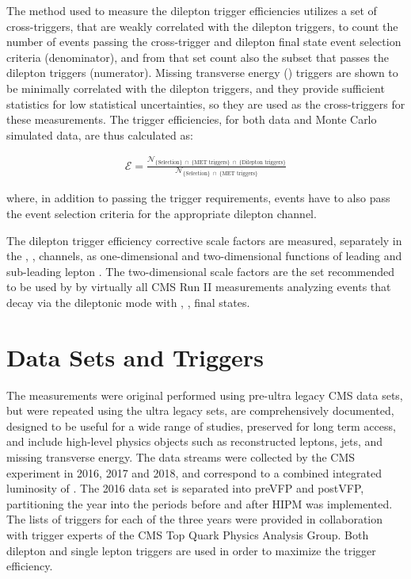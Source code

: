 The method used to measure the dilepton trigger efficiencies utilizes a set of cross-triggers, that are weakly correlated with the dilepton triggers, to count the number of events passing the cross-trigger and \ttbar dilepton final state event selection criteria (denominator), and from that set count also the subset that passes the dilepton triggers (numerator).
Missing transverse energy (\MET) triggers are shown to be minimally correlated with the dilepton triggers, and they provide sufficient statistics for low statistical uncertainties, so they are used as the cross-triggers for these measurements. 
The trigger efficiencies, for both data and Monte Carlo simulated data, are thus calculated as: 
\begin{linenomath*}
\begin{align}
\mathcal{E} = \frac{\mathcal{N}_{\{\text{Selection}\} \; \cap \; \{\text{MET triggers}\} \; \cap \; \{\text{Dilepton triggers\}}}}{\mathcal{N}_{\{\text{Selection}\} \; \cap \; \{\text{MET triggers\}}}}
\label{efficiency}
\end{align}
\end{linenomath*}
where, in addition to passing the trigger requirements, events have to also pass the event selection criteria for the appropriate dilepton channel. 

The dilepton trigger efficiency corrective scale factors are measured, separately in the \ee, \emu, \mumu channels, as one-dimensional and two-dimensional functions of leading and sub-leading lepton \pT.
The two-dimensional scale factors are the set recommended to be used by by virtually all CMS Run II measurements analyzing \ttbar events that decay via the dileptonic mode with \ee, \emu, \mumu final states.

\section{Data Sets and Triggers}
The measurements were original performed using pre-ultra legacy CMS data sets, but were repeated using the ultra legacy sets, are comprehensively documented, designed to be useful for a wide range of studies, preserved for long term access, and include high-level physics objects such as reconstructed leptons, jets, and missing transverse energy.
The data streams were collected by the CMS experiment in 2016, 2017 and 2018, and correspond to a combined integrated luminosity of \lumivalueRuniiUL.
The 2016 data set is separated into preVFP and postVFP, partitioning the year into the periods before and after HIPM was implemented.
The lists of triggers for each of the three years were provided in collaboration with trigger experts of the CMS Top Quark Physics Analysis Group. 
Both dilepton and single lepton triggers are used in order to maximize the trigger efficiency. 

